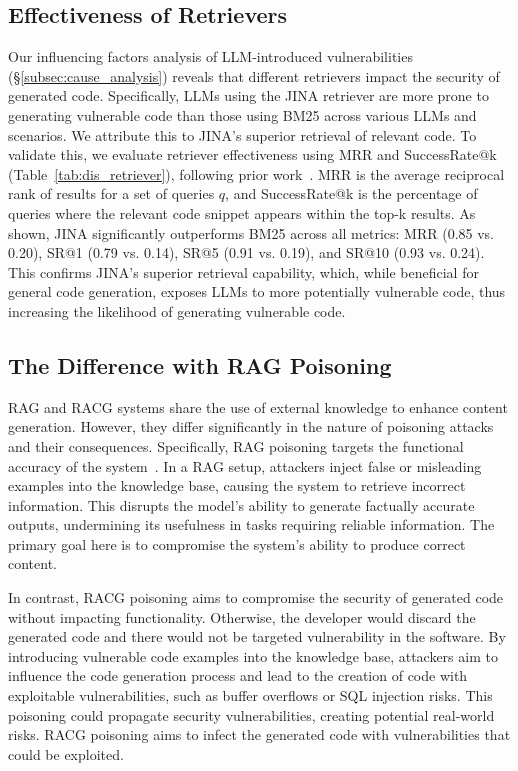 \subsection{Effectiveness of Retrievers}

Our influencing factors analysis of LLM-introduced vulnerabilities (\S\ref{subsec:cause_analysis}) reveals that different retrievers impact the security of generated code. Specifically, LLMs using the JINA retriever are more prone to generating vulnerable code than those using BM25 across various LLMs and scenarios. We attribute this to JINA's superior retrieval of relevant code. To validate this, we evaluate retriever effectiveness using MRR and SuccessRate@k (Table~\ref{tab:dis_retriever}), following prior work~\cite{liu2021opportunities,wang2024fusing}. MRR is the average reciprocal rank of results for a set of queries $q$, and SuccessRate@k is the percentage of queries where the relevant code snippet appears within the top-k results. As shown, JINA significantly outperforms BM25 across all metrics: MRR (0.85 vs. 0.20), SR@1 (0.79 vs. 0.14), SR@5 (0.91 vs. 0.19), and SR@10 (0.93 vs. 0.24). This confirms JINA's superior retrieval capability, which, while beneficial for general code generation, exposes LLMs to more potentially vulnerable code, thus increasing the likelihood of generating vulnerable code.

\subsection{The Difference with RAG Poisoning}
\label{subsec:diff_rag_poisoning}
RAG and RACG systems share the use of external knowledge to enhance content generation. However, they differ significantly in the nature of poisoning attacks and their consequences. Specifically, RAG poisoning targets the functional accuracy of the system~\cite{zou2024poisonedrag,zhang2024hijackrag}. In a RAG setup, attackers inject false or misleading examples into the knowledge base, causing the system to retrieve incorrect information. This disrupts the model’s ability to generate factually accurate outputs, undermining its usefulness in tasks requiring reliable information. The primary goal here is to compromise the system’s ability to produce correct content. 

In contrast, RACG poisoning aims to compromise the security of generated code without impacting functionality. Otherwise, the developer would discard the generated code and there would not be targeted vulnerability in the software.
By introducing vulnerable code examples into the knowledge base, attackers aim to influence the code generation process and lead to the creation of code with exploitable vulnerabilities, such as buffer overflows or SQL injection risks. This poisoning could propagate security vulnerabilities, creating potential real-world risks. RACG poisoning aims to infect the generated code with vulnerabilities that could be exploited.

